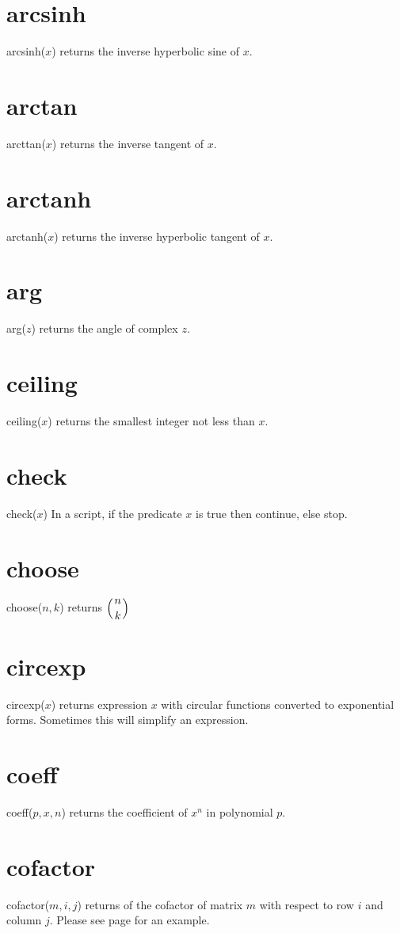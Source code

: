 \documentclass[12pt]{book}
\begin{document}
\section*{arcsinh}
arcsinh($x$) returns the inverse hyperbolic sine of $x$.

\section*{arctan}
arcttan($x$) returns the inverse tangent of $x$.

\section*{arctanh}
arctanh($x$) returns the inverse hyperbolic tangent of $x$.

\section*{arg}
arg($z$) returns the angle of complex $z$.

\section*{ceiling}
ceiling($x$) returns the smallest integer not less than $x$.

\section*{check}
check($x$) In a script, if the predicate $x$ is true then continue, else stop.

\section*{choose}
choose($n,k$) returns $\displaystyle\left({n \atop k}\right)$

\section*{circexp}
circexp($x$) returns expression $x$ with circular functions converted
to exponential forms.
Sometimes this will simplify an expression.

\section*{coeff}
coeff($p,x,n$) returns the coefficient of $x^n$ in polynomial $p$.

\section*{cofactor}
cofactor($m,i,j$) returns of the cofactor of matrix $m$ with respect to row $i$ and column $j$.
Please see page \pageref{cofactor} for an example.
\end{document}
